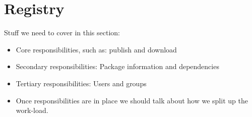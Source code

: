 
\section{Registry}

Stuff we need to cover in this section:

\begin{itemize}
\item Core responsibilities, such as: publish and download
\item Secondary responsibilities: Package information and dependencies
\item Tertiary responsibilities: Users and groups
\item Once responsibilities are in place we should talk about how we split up
the work-load.
\end{itemize}
